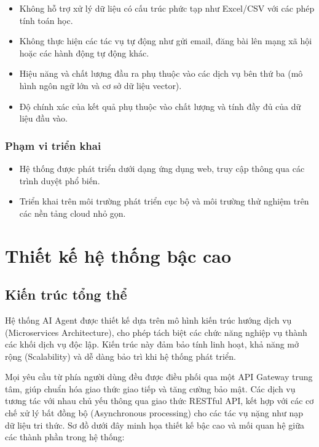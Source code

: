 \begin{itemize}
\item
  Không hỗ trợ xử lý dữ liệu có cấu trúc phức tạp như Excel/CSV với các
  phép tính toán học.
\item
  Không thực hiện các tác vụ tự động như gửi email, đăng bài lên mạng xã
  hội hoặc các hành động tự động khác.
\item
  Hiệu năng và chất lượng đầu ra phụ thuộc vào các dịch vụ bên thứ ba
  (mô hình ngôn ngữ lớn và cơ sở dữ liệu vector).
\item
  Độ chính xác của kết quả phụ thuộc vào chất lượng và tính đầy đủ của
  dữ liệu đầu vào.
\end{itemize}

\subsubsection{Phạm vi triển khai}\label{phux1ea1m-vi-triux1ec3n-khai}

\begin{itemize}
\item
  Hệ thống được phát triển dưới dạng ứng dụng web, truy cập thông qua
  các trình duyệt phổ biến.
\item
  Triển khai trên môi trường phát triển cục bộ và môi trường thử nghiệm
  trên các nền tảng cloud nhỏ gọn.
\end{itemize}

\section{Thiết kế hệ thống bậc
cao}\label{thiux1ebft-kux1ebf-hux1ec7-thux1ed1ng-bux1eadc-cao}

\subsection{Kiến trúc tổng
thể}\label{kiux1ebfn-truxfac-tux1ed5ng-thux1ec3}

Hệ thống AI Agent được thiết kế dựa trên mô hình kiến trúc hướng dịch vụ
(Microservices Architecture), cho phép tách biệt các chức năng nghiệp vụ
thành các khối dịch vụ độc lập. Kiến trúc này đảm bảo tính linh hoạt,
khả năng mở rộng (Scalability) và dễ dàng bảo trì khi hệ thống phát
triển.

Mọi yêu cầu từ phía người dùng đều được điều phối qua một API Gateway
trung tâm, giúp chuẩn hóa giao thức giao tiếp và tăng cường bảo mật. Các
dịch vụ tương tác với nhau chủ yếu thông qua giao thức RESTful API, kết
hợp với các cơ chế xử lý bất đồng bộ (Asynchronous processing) cho các
tác vụ nặng như nạp dữ liệu tri thức. Sơ đồ dưới đây minh họa thiết kế
bậc cao và mối quan hệ giữa các thành phần trong hệ thống:

